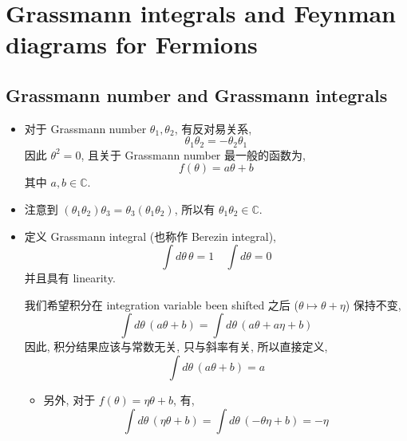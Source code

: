 \chapter{Grassmann integrals and Feynman diagrams for Fermions}
\section{Grassmann number and Grassmann integrals}
\begin{itemize}
	\item 对于 Grassmann number $\theta_1, \theta_2$, 有反对易关系,
	\begin{equation}
		\theta_1 \theta_2 = - \theta_2 \theta_1
	\end{equation}
	因此 $\theta^2 = 0$, 且关于 Grassmann number 最一般的函数为,
	\begin{equation}
		f(\theta) = a \theta + b
	\end{equation}
	其中 $a, b \in \mathbb{C}$.
	
	\item 注意到 $(\theta_1 \theta_2) \theta_3 = \theta_3 (\theta_1 \theta_2)$, 所以有 $\theta_1 \theta_2 \in \mathbb{C}$.
	
	\item 定义 Grassmann integral (也称作 Berezin integral),
	\begin{equation}
		\int d\theta \, \theta = 1 \quad \int d\theta = 0
	\end{equation}
	并且具有 linearity.
	
	\begin{tcolorbox}[title=comment:]
		我们希望积分在 integration variable been shifted 之后 ($\theta \mapsto \theta + \eta$) 保持不变,
		\begin{equation}
			\int d\theta \, (a \theta + b) = \int d\theta \, (a \theta + a \eta + b)
		\end{equation}
		因此, 积分结果应该与常数无关, 只与斜率有关, 所以直接定义,
		\begin{equation}
			\int d\theta \, (a \theta + b) = a
		\end{equation}
	\end{tcolorbox}
	
	\begin{itemize}
		\item 另外, 对于 $f(\theta) = \eta \theta + b$, 有,
		\begin{equation}
			\int d\theta \, (\eta \theta + b) = \int d\theta \, (- \theta \eta + b) = - \eta
		\end{equation}
	\end{itemize}
\end{itemize}

